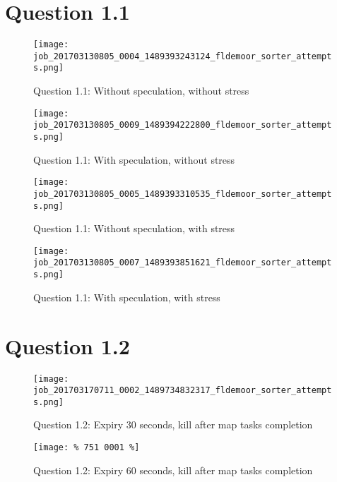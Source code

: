 \section{Question 1.1}

\begin{figure}[!ht]
    \centering
    \texttt{[image: job\_201703130805\_0004\_1489393243124\_fldemoor\_sorter\_attempts.png]}
    \caption{Question 1.1: Without speculation, without stress}
    \label{1.1.specOff.noStress}
\end{figure}
\newpage

\begin{figure}[!ht]
    \centering
    \texttt{[image: job\_201703130805\_0009\_1489394222800\_fldemoor\_sorter\_attempts.png]}
    \caption{Question 1.1: With speculation, without stress}
    \label{1.1.specOn.noStress}
\end{figure}

\begin{figure}[!ht]
    \centering
    \texttt{[image: job\_201703130805\_0005\_1489393310535\_fldemoor\_sorter\_attempts.png]}
    \caption{Question 1.1: Without speculation, with stress}
    \label{1.1.specOff.Stress}
\end{figure}
\newpage

\begin{figure}[!ht]
    \centering
    \texttt{[image: job\_201703130805\_0007\_1489393851621\_fldemoor\_sorter\_attempts.png]}
    \caption{Question 1.1: With speculation, with stress}
    \label{1.1.specOn.Stress}
\end{figure}
\newpage

\section{Question 1.2}

\begin{figure}[!ht]
    \centering
    \texttt{[image: job\_201703170711\_0002\_1489734832317\_fldemoor\_sorter\_attempts.png]}
    \caption{Question 1.2: Expiry 30 seconds, kill after map tasks completion}
    \label{1.2.30s.reduce}
\end{figure}
\newpage

\begin{figure}[!ht]
    \centering
    \texttt{[image: \% 751 0001 \%]}
    \caption{Question 1.2: Expiry 60 seconds, kill after map tasks completion}
    \label{1.2.60s.reduce}
\end{figure}
\newpage

